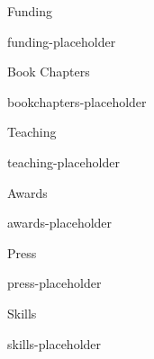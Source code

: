 \begin{cvSection}{Funding}

{{funding-placeholder}}

\end{cvSection}


\begin{cvSection}{Book Chapters}

{{bookchapters-placeholder}}

\end{cvSection}


\begin{cvSection}{Teaching}

{{teaching-placeholder}}

\end{cvSection}


\begin{cvSection}{Awards}

{{awards-placeholder}}

\end{cvSection}


\begin{cvSection}{Press}

{{press-placeholder}}

\end{cvSection}


\begin{cvSection}{Skills}

{{skills-placeholder}}

\end{cvSection}



